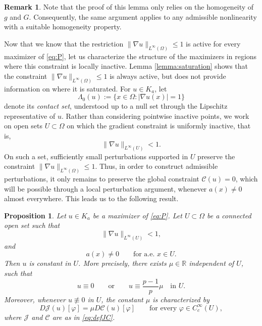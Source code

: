 \documentclass[11pt,reqno]{amsart}
\theoremstyle{plain}
\newtheorem{proposition}[theorem]{Proposition}
\theoremstyle{definition}
\newtheorem{remark}[theorem]{Remark}
\numberwithin{equation}{section}
\begin{document}
\begin{remark}
    Note that the proof of this lemma only relies on the homogeneity of
    $g$ and $G$. Consequently, the same argument applies to any admissible
    nonlinearity with a suitable homogeneity property.
\end{remark}

Now that we know that the restriction
$\|\nabla u\|_{L^{\infty}(\Omega)}\leq 1$ is active for every maximizer of
\eqref{eq:P}, let us characterize the structure of the maximizers in
regions where this constraint is locally inactive. 
Lemma \ref{lemma:saturation} shows that the constraint
$\|\nabla u\|_{L^\infty(\Omega)}\leq1$ is always active, but does not
provide information on where it is saturated. For $u\in K_a$, let
\begin{equation}\label{eq:contact-set}
\Lambda_0 (u):=\{x\in\Omega:|\nabla u(x)|=1\}
\end{equation}
denote its \emph{contact set}, understood up to a null set through the
Lipschitz representative of $u$. Rather than considering pointwise inactive points, we work on open sets
$U\subset\Omega$ on which the gradient constraint is uniformly inactive,
that is,
$$
\|\nabla u\|_{L^\infty(U)}<1.
$$
On such a set, sufficiently small perturbations supported in $U$ preserve
the constraint $\|\nabla u\|_{L^\infty(\Omega)}\leq1$. Thus, in order to
construct admissible perturbations, it only remains to preserve the
global constraint $\mathcal C(u)=0$, which will be possible through a local perturbation argument, whenever $a(x) \not = 0 $ almost everywhere. This leads us to the following result.

\begin{proposition}
\label{prop:inactive-region}
Let $u \in K_a$ be a maximizer of \eqref{eq:P}. Let
$U\subset\Omega$ be a connected open set such that
$$
\|\nabla u\|_{L^\infty(U)}<1,
$$
and
$$
a(x)\neq 0
\qquad\text{for a.e. }x\in U.
$$
Then $u$ is constant in $U$. More precisely, there exists
$\mu\in\mathbb R$ independent of $U$, such that
$$u\equiv0
\qquad\text{or}\qquad
u\equiv\frac{p-1}{p}\mu
\quad\text{in }U.$$
Moreover, whenever $u\not\equiv0$ in $U$, the constant $\mu$ is
characterized by
$$
D\mathcal J(u)[\varphi]
=
\mu D\mathcal C(u)[\varphi]
\qquad
\text{for every }\varphi\in C_c^\infty(U),
$$
where $\mathcal J$ and $\mathcal C$ are as in \eqref{eq:defJC}.
\end{proposition}
\end{document}
